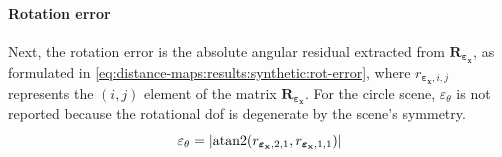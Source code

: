 \paragraph{Rotation error}
Next, the rotation error is the absolute angular residual extracted from
$\mathbf{R}_{\boldsymbol{\varepsilon}_\mathbf{x}}$, as formulated in
\eqref{eq:distance-maps:results:synthetic:rot-error}, where
$r_{\boldsymbol{\varepsilon}_\mathbf{x},i,j}$ represents the $(i,j)$ element
of the matrix $\mathbf{R}_{\boldsymbol{\varepsilon}_\mathbf{x}}$.
For the circle scene, $\varepsilon_\theta$ is not reported because
the rotational \gls{dof} is degenerate by the scene's symmetry.
\begin{equation}
\label{eq:distance-maps:results:synthetic:rot-error}
\varepsilon_\theta =
\left|\atan2\!\left(
  r_{\boldsymbol{\varepsilon}_\mathbf{x},2,1},
  r_{\boldsymbol{\varepsilon}_\mathbf{x},1,1}\right)\right|
\end{equation}

